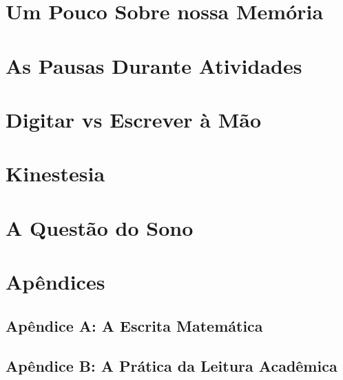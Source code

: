 \documentclass{article}
\begin{document}
\section{Um Pouco Sobre nossa Memória}
\newpage
\section{As Pausas Durante Atividades}
\newpage
\section{Digitar vs Escrever à Mão}
\newpage
\section{Kinestesia}
\newpage
\section{A Questão do Sono}
\newpage
\section{Apêndices}
\subsection{Apêndice A: A Escrita Matemática}
\subsection{Apêndice B: A Prática da Leitura Acadêmica}
\newpage

\printbibliography
 

 
\end{document}
